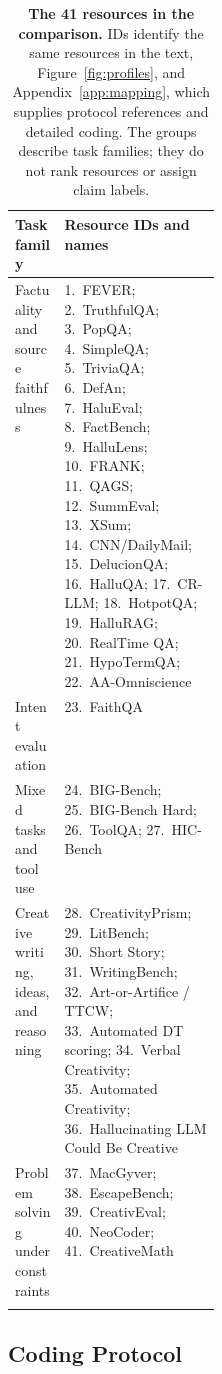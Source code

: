 \documentclass{clv2025}
\begin{document}
\begin{table}[!ht]
\centering\small
\setlength{\tabcolsep}{5pt}\renewcommand{\arraystretch}{1.15}
\caption{\textbf{The 41 resources in the comparison.} IDs identify the same
resources in the text, Figure~\ref{fig:profiles}, and Appendix~\ref{app:mapping},
which supplies protocol references and detailed coding. The groups describe
task families; they do not rank resources or assign claim labels.}
\label{tab:resource-inventory}
\begin{tabularx}{\linewidth}{@{}P{0.24\linewidth}Y@{}}
\toprule\textbf{Task family} & \textbf{Resource IDs and names}\\\midrule
Factuality and source faithfulness & 1.~FEVER; 2.~TruthfulQA; 3.~PopQA; 4.~SimpleQA; 5.~TriviaQA; 6.~DefAn; 7.~HaluEval; 8.~FactBench; 9.~HalluLens; 10.~FRANK; 11.~QAGS; 12.~SummEval; 13.~XSum; 14.~CNN/DailyMail; 15.~DelucionQA; 16.~HalluQA; 17.~CR-LLM; 18.~HotpotQA; 19.~HalluRAG; 20.~RealTime QA; 21.~HypoTermQA; 22.~AA-Omniscience\\\addlinespace[4pt]
Intent evaluation & 23.~FaithQA\\\addlinespace[4pt]
Mixed tasks and tool use & 24.~BIG-Bench; 25.~BIG-Bench Hard; 26.~ToolQA; 27.~HIC-Bench\\\addlinespace[4pt]
Creative writing, ideas, and reasoning & 28.~CreativityPrism; 29.~LitBench; 30.~Short Story; 31.~WritingBench; 32.~Art-or-Artifice / TTCW; 33.~Automated DT scoring; 34.~Verbal Creativity; 35.~Automated Creativity; 36.~Hallucinating LLM Could Be Creative\\\addlinespace[4pt]
Problem solving under constraints & 37.~MacGyver; 38.~EscapeBench; 39.~CreativEval; 40.~NeoCoder; 41.~CreativeMath\\\addlinespace[4pt]
\bottomrule\end{tabularx}\end{table}\FloatBarrier

\subsection{Coding Protocol}
\end{document}
